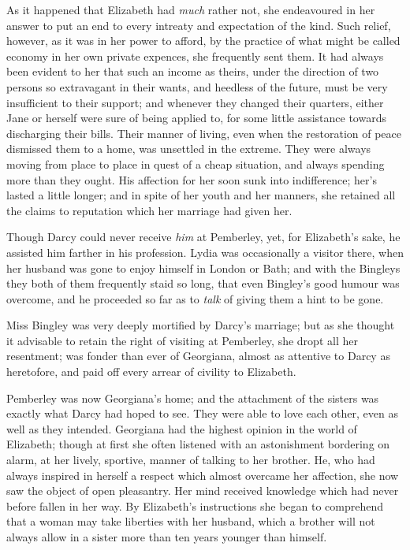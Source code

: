 As it happened that Elizabeth had \textit{much} rather not,
she endeavoured in her answer to put an end to every
intreaty and expectation of the kind. Such relief, however,
as it was in her power to afford, by the practice of
what might be called economy in her own private expences,
she frequently sent them. It had always been evident
to her that such an income as theirs, under the direction
of two persons so extravagant in their wants, and heedless
of the future, must be very insufficient to their support;
and whenever they changed their quarters, either Jane
or herself were sure of being applied to, for some little
assistance towards discharging their bills. Their manner
of living, even when the restoration of peace dismissed
them to a home, was unsettled in the extreme. They were
always moving from place to place in quest of a cheap
situation, and always spending more than they ought.
His affection for her soon sunk into indifference; her’s
lasted a little longer; and in spite of her youth and her
manners, she retained all the claims to reputation which
her marriage had given her.

Though Darcy could never receive \textit{him} at Pemberley,
yet, for Elizabeth’s sake, he assisted him farther in his
profession. Lydia was occasionally a visitor there, when
her husband was gone to enjoy himself in London or
Bath; and with the Bingleys they both of them frequently
staid so long, that even Bingley’s good humour was overcome,
and he proceeded so far as to \textit{talk} of giving them
a hint to be gone.

Miss Bingley was very deeply mortified by Darcy’s
marriage; but as she thought it advisable to retain the
right of visiting at Pemberley, she dropt all her resentment;
was fonder than ever of Georgiana, almost as
attentive to Darcy as heretofore, and paid off every arrear
of civility to Elizabeth.

Pemberley was now Georgiana’s home; and the attachment
of the sisters was exactly what Darcy had hoped
to see. They were able to love each other, even as well
as they intended. Georgiana had the highest opinion in
the world of Elizabeth; though at first she often listened
with an astonishment bordering on alarm, at her lively,
sportive, manner of talking to her brother. He, who had
always inspired in herself a respect which almost overcame
her affection, she now saw the object of open pleasantry.
Her mind received knowledge which had never before
fallen in her way. By Elizabeth’s instructions she began
to comprehend that a woman may take liberties with her
husband, which a brother will not always allow in a sister
more than ten years younger than himself.

